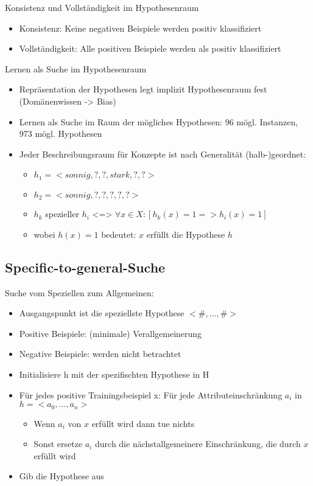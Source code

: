\documentclass[paper=a4, fontsize=11pt]{scrartcl} %
\numberwithin{equation}{section} %
\numberwithin{figure}{section} %
\numberwithin{table}{section} %
\begin{document}
Konsistenz und Vollständigkeit im Hypothesenraum
\begin{itemize}
\item Konsistenz: Keine negativen Beispiele werden positiv klassifiziert
\item Vollständigkeit: Alle positiven Beispiele werden als positiv klassifiziert
\end{itemize}

Lernen als Suche im Hypothesenraum
\begin{itemize}
\item Repräsentation der Hypothesen legt implizit Hypothesenraum fest (Domänenwissen -> Bias)
\item Lernen als Suche im Raum der mögliches Hypothesen: 96 mögl. Instanzen, 973 mögl. Hypothesen
\item Jeder Beschreibungsraum für Konzepte ist nach Generalität (halb-)geordnet:
\begin{itemize}
\item $h_1 = <sonnig,?,?,stark,?,?>$
\item $h_2 = <sonnig,?,?,?,?,?>$
\item $h_k$ spezieller $h_i$ <=> $\forall x \in X: [h_k(x) = 1 => h_i(x) = 1]$
\item wobei $h(x) = 1$ bedeutet: $x$ erfüllt die Hypothese $h$
\end{itemize}
\end{itemize}

\subsection{Specific-to-general-Suche}

Suche vom Speziellen zum Allgemeinen:
\begin{itemize}
\item Ausgangspunkt ist die speziellste Hypothese $<\#,...,\#>$
\item Positive Beispiele: (minimale) Verallgemeinerung
\item Negative Beispiele: werden nicht betrachtet
\end{itemize}

\begin{itemize}
\item Initialisiere h mit der spezifischten Hypothese in H
\item Für jedes positive Trainingsbeispiel x: Für jede Attributeinschränkung $a_i $ in $h = <a_0,...,a_n>$
\begin{itemize}
\item Wenn $a_i$ von $x$ erfüllt wird dann tue nichts
\item Sonst ersetze $a_i$ durch die nächstallgemeinere Einschränkung, die durch $x$ erfüllt wird
\end{itemize}
\item Gib die Hypothese aus
\end{itemize}
\end{document}
